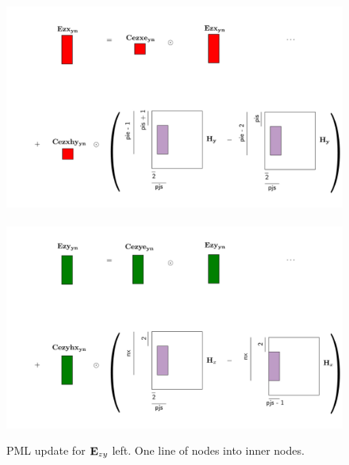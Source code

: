 \documentclass[a4paper,12pt]{article}
\begin{document}
\begin{figure}
\centering
\includegraphics[width=1\textwidth]{../pics/tikz/svg/pml-color/Ezx-yn.pdf}
~
\includegraphics[width=1\textwidth]{../pics/tikz/svg/pml-color/Ezy-yn.pdf}
\caption{PML update for ${\bf E}_{zy}$ left. One line of nodes into inner nodes.}
\end{figure}
%
\end{document}
